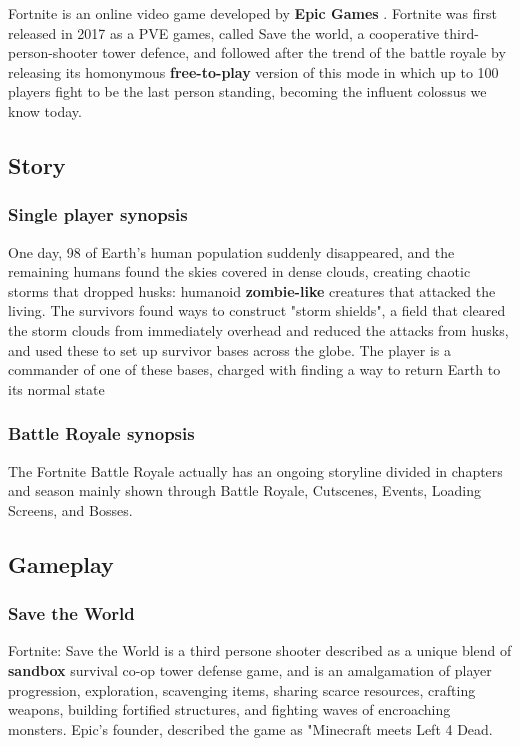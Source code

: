 \documentclass[a4paper,10pt]{book}
\begin{document}
          Fortnite is an online video game developed by  \textbf{Epic Games } . Fortnite was first released in 2017 as a PVE games, called Save the world,
          a cooperative third-person-shooter tower defence, and followed after the trend of the battle royale by releasing its homonymous  \textbf{free-to-play }  version
          of this mode in which up to 100 players fight to be the last person standing, becoming the influent colossus we know today.
         
 
 \subsection{Story }
 \subsubsection{Single player synopsis }
 
          One day, 98 of Earth's human population suddenly disappeared, and the remaining humans found the skies covered in dense clouds, creating chaotic storms that dropped husks:
          humanoid  \textbf{zombie-like }  creatures that attacked the living. The survivors found ways to construct "storm shields", a field that cleared the storm clouds from immediately
           overhead and reduced the attacks from husks, and used these to set up survivor bases across the globe. The player is a commander of one of these bases, charged with finding
           a way to return Earth to its normal state
         
 \subsubsection{ Battle Royale synopsis }
 
          The Fortnite Battle Royale actually has an ongoing storyline divided in chapters and season mainly shown through Battle Royale, Cutscenes, Events, Loading Screens, and Bosses.
         
 
 \subsection{ Gameplay }
 
 \subsubsection{Save the World }
 
        Fortnite: Save the World is a third persone shooter described as a unique blend of  \textbf{sandbox }  survival co-op tower defense game, and is an amalgamation of player progression, exploration,
        scavenging items, sharing scarce resources, crafting weapons, building fortified structures, and fighting waves of encroaching monsters. Epic's founder, described the game as "Minecraft meets Left 4 Dead.
         
\end{document}
